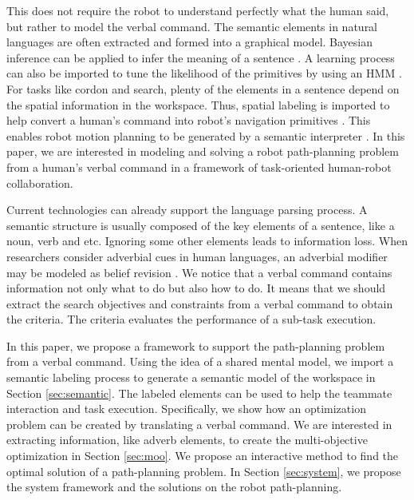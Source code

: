 This does not require the robot to understand perfectly what the human said, but rather to model the verbal command.
The semantic elements in natural languages are often extracted and formed into a graphical model.
Bayesian inference can be applied to infer the meaning of a sentence \cite{conf/aaai/TellexKDWBTR11}. 
A learning process can also be imported to tune the likelihood of the primitives by using an HMM \cite{6343895}.
For tasks like cordon and search, plenty of the elements in a sentence depend on the spatial information in the workspace.
Thus, spatial labeling is imported to help convert a human's command into robot's navigation primitives \cite{5453186}.
This enables robot motion planning to be generated by a semantic interpreter \cite{6696345}.
In this paper, we are interested in modeling and solving a robot path-planning problem from a human's verbal command in a framework of task-oriented human-robot collaboration.

Current technologies can already support the language parsing process.
A semantic structure is usually composed of the key elements of a sentence, like a noun, verb and etc. 
Ignoring some other elements leads to information loss.
When researchers consider adverbial cues in human languages, an adverbial modifier may be modeled as belief revision \cite{Briggs:2011:FMM:2132890.2132916}.
We notice that a verbal command contains information not only what to do but also how to do.
It means that we should extract the search objectives and constraints from a verbal command to obtain the criteria.
The criteria evaluates the performance of a sub-task execution.

In this paper, we propose a framework to support the path-planning problem from a verbal command.
Using the idea of a shared mental model, we import a semantic labeling process to generate a semantic model of the workspace in Section \ref{sec:semantic}.
The labeled elements can be used to help the teammate interaction and task execution.
Specifically, we show how an optimization problem can be created by translating a verbal command.
We are interested in extracting information, like adverb elements, to create the multi-objective optimization in Section \ref{sec:moo}.
We propose an interactive method to find the optimal solution of a path-planning problem.
In Section \ref{sec:system}, we propose the system framework and the solutions on the robot path-planning.
